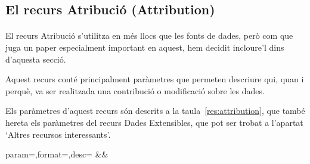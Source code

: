 \subsection{El recurs Atribució (Attribution)}

    \paragraph{}
    El recurs Atribució s'utilitza en més llocs que les fonts de dades, però com que juga un paper especialment important en aquest, hem decidit incloure'l dins d'aquesta secció.

    Aquest recurs conté principalment paràmetres que permeten descriure qui, quan i perquè, va ser realitzada una contribució o modificació sobre les dades.

    Els paràmetres d'aquest recurs són descrits a la taula~\ref{res:attribution}, que també hereta els paràmetres del recurs Dades Extensibles, que pot ser trobat a l'apartat `Altres recursos interessants'.

    \begin{center}
             {param=\param,format=\format,desc=\desc}
             {\param&\format&\desc}
     \end{center}
